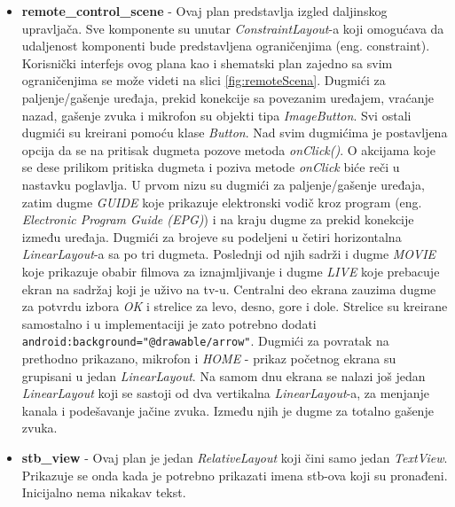 \documentclass[implementacija.tex]{subfiles}
\begin{document}
\begin{itemize}
\item \textbf{remote\_control\_scene} - Ovaj plan predstavlja izgled daljinskog upravljača. Sve komponente su unutar \textit{ConstraintLayout}-a koji omogućava da udaljenost komponenti bude predstavljena ograničenjima (eng. constraint). Korisnički interfejs ovog plana kao i shematski plan zajedno sa svim ograničenjima se može videti na slici \ref{fig:remoteScena}. Dugmići za paljenje/gašenje uređaja, prekid konekcije sa povezanim uređajem, vraćanje nazad, gašenje zvuka i mikrofon su objekti tipa \textit{ImageButton}. Svi ostali dugmići su kreirani pomoću klase \textit{Button}. Nad svim dugmićima je postavljena opcija da se na pritisak dugmeta pozove metoda \textit{onClick()}. O akcijama koje se dese prilikom pritiska dugmeta i poziva metode \textit{onClick} biće reči u nastavku poglavlja. U prvom nizu su dugmići za paljenje/gašenje uređaja, zatim dugme \textit{GUIDE} koje prikazuje elektronski vodič kroz program (eng. \textit{Electronic Program Guide (EPG)}) i na kraju dugme za prekid konekcije između uređaja. Dugmići za brojeve su podeljeni u četiri horizontalna \textit{LinearLayout}-a sa po tri dugmeta. Poslednji od njih sadrži i dugme \textit{MOVIE} koje prikazuje obabir filmova za iznajmljivanje i dugme \textit{LIVE} koje prebacuje ekran na sadržaj koji je uživo na tv-u. Centralni deo ekrana zauzima dugme za potvrdu izbora \textit{OK} i strelice za levo, desno, gore i dole. Strelice su kreirane samostalno i u implementaciji je zato potrebno dodati  \verb|android:background="@drawable/arrow"|. Dugmići za povratak na prethodno prikazano, mikrofon i \textit{HOME} - prikaz početnog ekrana su grupisani u jedan \textit{LinearLayout}. Na samom dnu ekrana se nalazi još jedan \textit{LinearLayout} koji se sastoji od dva vertikalna \textit{LinearLayout}-a, za menjanje kanala i podešavanje jačine zvuka. Između njih je dugme za totalno gašenje zvuka.  
\item \textbf{stb\_view} - Ovaj plan je jedan \textit{RelativeLayout} koji čini samo jedan \textit{TextView}. Prikazuje se onda kada je potrebno prikazati imena stb-ova koji su pronađeni. Inicijalno nema nikakav tekst.
\end{itemize}
\end{document}
